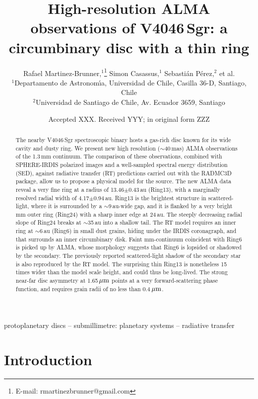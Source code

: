 \documentclass[letters,usenatbib,times]{mnras}
\title[High-resolution ALMA observations of V4046\,Sgr]{High-resolution ALMA observations of V4046\,Sgr: a circumbinary disc with a thin ring}
\author[R. Martinez Brunner et al.]{
Rafael Martinez-Brunner,$^{1}$\thanks{E-mail: rmartinezbrunner@gmail.com}
Simon Casassus,$^{1}$
Sebasti\'an P\'erez,$^{2}$
et al. 
\\
$^{1}$Departamento de Astronom\'{\i}a, Universidad de Chile, Casilla 36-D, Santiago, Chile\\
$^{2}$Universidad de Santiago de Chile, Av. Ecuador 3659, Santiago\\
}
\date{Accepted XXX. Received YYY; in original form ZZZ}
\begin{document}
\label{firstpage}
\pagerange{\pageref{firstpage}--\pageref{lastpage}}
\maketitle

\begin{abstract}
  The nearby V4046\,Sgr spectroscopic binary hosts a gas-rich disc known for its wide cavity and dusty ring. We present new high resolution ($\sim$40\,mas) ALMA observations of the 1.3\,mm continuum. The comparison of these observations, combined with SPHERE-IRDIS polarized images and a well-sampled spectral energy distribution (SED), against radiative transfer (RT) predictions carried out with the RADMC3D package, allow us to propose a physical model for the source. The new ALMA data reveal a very fine ring at a radius of 13.46$\pm$0.43\,au (Ring13), with a marginally resolved radial width of 4.17$\pm$0.94\,au. Ring13 is the brightest structure in scattered-light, where it is surrounded by a $\sim$9\,au-wide gap, and it is flanked by a very bright mm outer ring (Ring24) with a sharp inner edge at 24\,au. The steeply decreasing radial slope of Ring24 breaks at $\sim$35\,au into a shallow tail. The RT model requires an inner ring at $\sim$6\,au (Ring6) in small dust grains, hiding under the IRDIS coronagraph, and that surrounds an inner circumbinary disk. Faint mm-continuum coincident with Ring6 is picked up by ALMA, whose morphology suggests that Ring6 is lopsided or shadowed by the secondary. The previously reported scattered-light shadow of the secondary star is also reproduced by the RT model. The surprising thin Ring13 is nonetheless 15 times wider than the model scale height, and could thus be long-lived. The strong near-far disc asymmetry at 1.65\,$\hbox{$\mu$m}$ points at a very forward-scattering phase function, and requires grain radii of no less than 0.4\,$\hbox{$\mu$m}$. 
\end{abstract}

\begin{keywords}
 protoplanetary discs -- submillimetre: planetary systems -- radiative transfer
\end{keywords}



\section{Introduction} \label{sec:Introduction}
\end{document}
